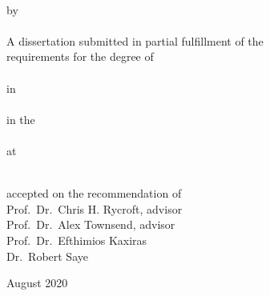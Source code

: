 
\begin{titlepage}
    \begin{center}
        \large

        \hfill

        \vfill

        \begingroup
			{\Large \myTitle}
			\\[1.5em]
            by \\[1.5em]
            \myName
            \\[3em]
            A dissertation submitted in partial fulfillment of the \\
            requirements for the degree of \\[0.7em]
			 \\[0.7em]
			in \\[0.7em]
			 \\[0.7em]
			in the \\[0.7em]
			 \\[0.7em]
			at \\[0.7em]
			\\[3em]
        \endgroup

%
%        
%

        \vfill

        \begingroup
            accepted on the recommendation of \\[1em]
            Prof.\ Dr.\ Chris H. Rycroft, advisor \\
            Prof.\ Dr.\ Alex Townsend, advisor \\
			Prof.\ Dr.\ Efthimios Kaxiras \\
			Dr.\ Robert Saye
        \endgroup

		\vspace{2.5em}

        August 2020

        \vfill                      

    \end{center}
\end{titlepage}
